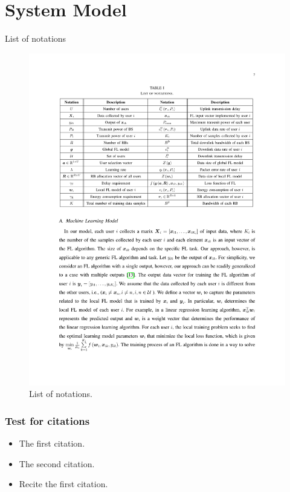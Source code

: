 \documentclass[9pt]{beamer}
\begin{document}
\frame[plain]{\titlepage}
\section{System Model}
\begin{frame}{List of notations}
    \begin{figure}
        \centering
        \includegraphics[width=\linewidth]{img/list.pdf}
        \caption{List of notations.} 
    \end{figure}
\end{frame}
\begin{frame}[t]
    \frametitle{Test for citations}
    \begin{itemize}
        \item The first citation.\cite{dl1}
        \item The second citation. \cite{iot1}
        \item Recite the first citation. \cite{dl1}
    \end{itemize}
\end{frame}
\end{document}
